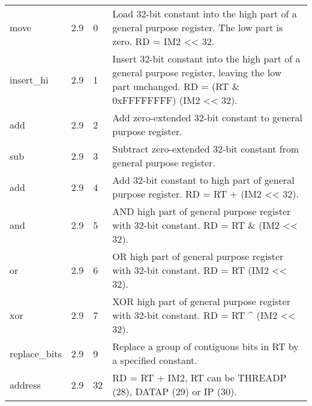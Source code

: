 \documentclass[forwardcom.tex]{subfiles}
\begin{document}
\begin{longtable} {|p{20mm}|p{10mm}|p{8mm}|p{75mm}|}
move          & 2.9   &  0  & Load 32-bit constant into the high part of a general purpose register. The low part is zero. RD = IM2 \textless\textless{} 32. \\
insert\_hi    & 2.9   &  1  & Insert 32-bit constant into the high part of a general purpose register, leaving the low part unchanged.
RD = (RT \& 0xFFFFFFFF) \textbar{} (IM2 \textless\textless{} 32). \\
add           & 2.9   &  2  & Add zero-extended 32-bit constant to general purpose register. \\
sub           & 2.9   &  3  & Subtract zero-extended 32-bit constant from general purpose register. \\
add           & 2.9   &  4  & Add 32-bit constant to high part of general purpose register. RD = RT + (IM2 \textless\textless{} 32). \\
and           & 2.9   &  5  & AND high part of general purpose register with 32-bit constant. RD = RT \& (IM2 \textless\textless{} 32). \\
or            & 2.9   &  6  & OR high part of general purpose register with 32-bit constant. RD = RT \textbar{} (IM2 \textless\textless{} 32). \\
xor           & 2.9   &  7  & XOR high part of general purpose register with 32-bit constant. RD = RT \^{} (IM2 \textless\textless{} 32). \\
replace\_bits & 2.9   &  9  & Replace a group of contiguous bits in RT by a specified constant. \\
address       & 2.9   & 32  & RD = RT + IM2, RT can be THREADP (28), DATAP (29) or IP (30). \\
\hline
\end{longtable}
\end{document}
